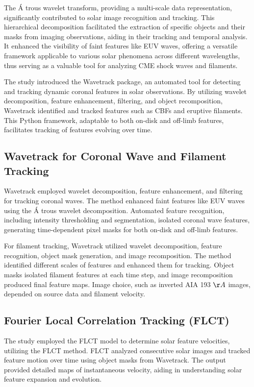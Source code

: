 The \'A trous wavelet transform, providing a multi-scale data representation, significantly contributed to solar image recognition and tracking. This hierarchical decomposition facilitated the extraction of specific objects and their masks from imaging observations, aiding in their tracking and temporal analysis. It enhanced the visibility of faint features like EUV waves, offering a versatile framework applicable to various solar phenomena across different wavelengths, thus serving as a valuable tool for analyzing CME shock waves and filaments.

The study introduced the Wavetrack package, an automated tool for detecting and tracking dynamic coronal features in solar observations. By utilizing wavelet decomposition, feature enhancement, filtering, and object recomposition, Wavetrack identified and tracked features such as CBFs and eruptive filaments. This Python framework, adaptable to both on-disk and off-limb features, facilitates tracking of features evolving over time.

\subsection{Wavetrack for Coronal Wave and Filament Tracking}
Wavetrack employed wavelet decomposition, feature enhancement, and filtering for tracking coronal waves. The method enhanced faint features like EUV waves using the \'A trous wavelet decomposition. Automated feature recognition, including intensity thresholding and segmentation, isolated coronal wave features, generating time-dependent pixel masks for both on-disk and off-limb features.

For filament tracking, Wavetrack utilized wavelet decomposition, feature recognition, object mask generation, and image recomposition. The method identified different scales of features and enhanced them for tracking. Object masks isolated filament features at each time step, and image recomposition produced final feature maps. Image choice, such as inverted AIA 193 $\AA$ images, depended on source data and filament velocity.

\subsection{Fourier Local Correlation Tracking (FLCT)}
The study employed the FLCT model to determine solar feature velocities, utilizing the FLCT method. FLCT analyzed consecutive solar images and tracked feature motion over time using object masks from Wavetrack. The output provided detailed maps of instantaneous velocity, aiding in understanding solar feature expansion and evolution.

